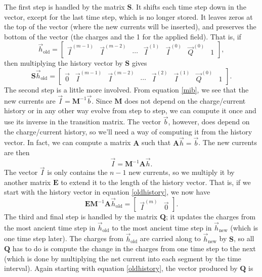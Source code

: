 \documentclass{article}
\newcommand{\mat}{\mathbf}
\begin{document}
The first step is handled by the matrix $\mat{S}$. It shifts each time step down in the vector, except for the last time step, which is no longer stored. It leaves zeros at the top of the vector (where the new currents will be inserted), and preserves the bottom of the vector (the charges and the 1 for the applied field). That is, if
\begin{equation}
\label{oldhistory}
\vec{h}_\text{old} = 
\begin{bmatrix}
\vec{I}^{(m-1)} & \vec{I}^{(m-2)} & \cdots & \vec{I}^{(1)} & \vec{I}^{(0)} & \vec{Q}^{(0)} & 1
\end{bmatrix},
\end{equation}
then multiplying the history vector by $\mat{S}$ gives
\begin{equation}
\mat{S}\vec{h}_\text{old} = 
\begin{bmatrix}
\vec{0} & \vec{I}^{(m-1)} & \vec{I}^{(m-2)} & \cdots & \vec{I}^{(2)} & \vec{I}^{(1)} & \vec{Q}^{(0)} & 1
\end{bmatrix}.
\end{equation}
The second step is a little more involved. From equation \ref{mib}, we see that the new currents are $\vec{I} = \mat{M}^{-1}\vec{b}$. Since $\mat{M}$ does not depend on the charge/current history or in any other way evolve from step to step, we can compute it once and use its inverse in the transition matrix. The vector $\vec{b}$, however, does depend on the charge/current history, so we'll need a way of computing it from the history vector. In fact, we can compute a matrix $\mat{A}$ such that $\mat{A}\vec{h} = \vec{b}$. The new currents are then
\begin{equation}
\vec{I} = \mat{M}^{-1}\mat{A}\vec{h}.
\end{equation}
The vector $\vec{I}$ is only contains the $n-1$ new currents, so we multiply it by another matrix $\mat{E}$ to extend it to the length of the history vector. That is, if we start with the history vector in equation \ref{oldhistory}, we now have
\begin{equation}
\mat{E}\mat{M}^{-1}\mat{A}\vec{h}_\text{old} = 
\begin{bmatrix}
\vec{I}^{(m)} & \vec{0}
\end{bmatrix}.
\end{equation}
The third and final step is handled by the matrix $\mat{Q}$; it updates the charges from the most ancient time step in $\vec{h}_\text{old}$ to the most ancient time step in $\vec{h}_\text{new}$ (which is one time step later). The charges from $\vec{h}_\text{old}$ are carried along to $\vec{h}_\text{new}$ by $\mat{S}$, so all $\mat{Q}$ has to do is compute the change in the charges from one time step to the next (which is done by multiplying the net current into each segment by the time interval). Again starting with equation \ref{oldhistory}, the vector produced by $\mat{Q}$ is
\end{document}
